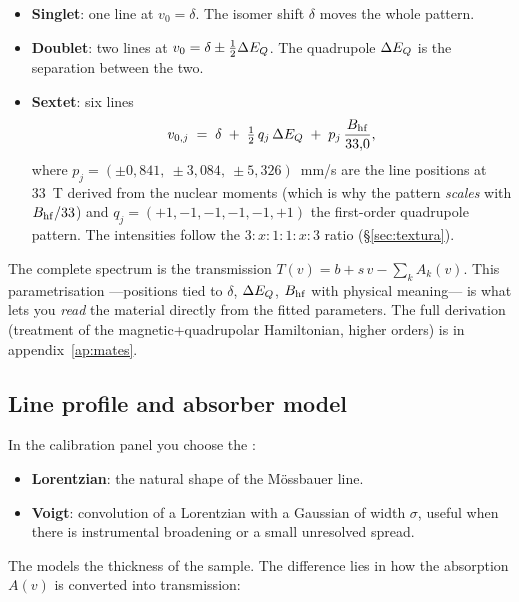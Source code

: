 \begin{itemize}[nosep]
  \item \textbf{Singlet}: one line at $v_0 = \delta$. The isomer
        shift $\delta$ moves the whole pattern.
  \item \textbf{Doublet}: two lines at $v_0 = \delta \pm \tfrac{1}{2}\Delta E_{Q}$. The
        quadrupole $\Delta E_{Q}$ is the separation between the two.
  \item \textbf{Sextet}: six lines
        \[
          v_{0,j} \;=\; \delta \;+\; \tfrac{1}{2}\,q_j\,\Delta E_{Q} \;+\;
          p_j\,\frac{B_{\mathrm{hf}}}{33{,}0},
        \]
        where $p_j = (\pm0{,}841,\ \pm3{,}084,\ \pm5{,}326)$~mm/s are the
        line positions at 33~T derived from the nuclear moments (which is why the pattern
        \emph{scales} with $B_{\mathrm{hf}}/33$) and $q_j=(+1,-1,-1,-1,-1,+1)$ the
        first-order quadrupole pattern. The intensities follow the
        $3:x:1:1:x:3$ ratio (§\ref{sec:textura}).
\end{itemize}

The complete spectrum is the transmission $T(v) = b + s\,v - \sum_k A_k(v)$. This
parametrisation —positions tied to $\delta$, $\Delta E_{Q}$, $B_{\mathrm{hf}}$ with physical
meaning— is what lets you \emph{read} the material directly from the fitted
parameters. The full derivation (treatment of the
magnetic+quadrupolar Hamiltonian, higher orders) is in appendix~\ref{ap:mates}.

\subsection{Line profile and absorber model}

In the calibration panel you choose the :

\begin{itemize}[nosep]
  \item \textbf{Lorentzian}: the natural shape of the Mössbauer line.
  \item \textbf{Voigt}: convolution of a Lorentzian with a Gaussian of width
        $\sigma$, useful when there is instrumental broadening or a small
        unresolved spread.
\end{itemize}

The  models the thickness of the sample. The difference lies in how
the absorption $A(v)$ is converted into transmission:


